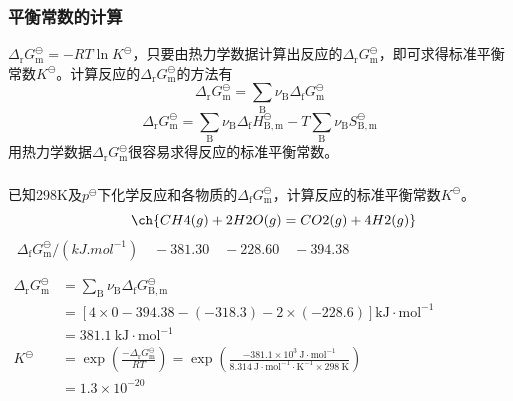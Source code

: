 \begin{frame}
    \frametitle{平衡常数的计算}
    \large $\Delta _\mathrm{r}G_\mathrm{m}^\ominus = -RT \ln K^\ominus$，只要由热力学数据计算出反应的$\Delta _\mathrm{r}G_\mathrm{m}^\ominus$，即可求得标准平衡常数$K^\ominus$。计算反应的$\Delta _\mathrm{r}G_\mathrm{m}^\ominus$的方法有
    \[
        \Delta_{\mathrm{r}} G_{\mathrm{m}}^{\ominus}=\sum_{\mathrm{B}} \nu_{\mathrm{B}} \Delta_{\mathrm{f}} G_{\mathrm{m}}^{\ominus}
    \]
    \[
        \Delta_{\mathrm{r}} G_{\mathrm{m}}^{\ominus}=\sum_{\mathrm{B}} \nu_{\mathrm{B}} \Delta_{\mathrm{f}} H_{\mathrm{B}, \mathrm{m}}^{\ominus}-T \sum_{\mathrm{B}} \nu_{\mathrm{B}} S_{\mathrm{B}, \mathrm{m}}^{\ominus}
    \]
    用热力学数据$\Delta _\mathrm{r}G_\mathrm{m}^\ominus$很容易求得反应的标准平衡常数。

\end{frame}


\begin{frame}[t]
    \frametitle{}

    \begin{example}
        已知298K及$p^\ominus$下化学反应和各物质的$\Delta _\mathrm{f}G_\mathrm{m}^\ominus$，计算反应的标准平衡常数$K^\ominus$。
        \[
            \qquad \ch{CH4(g) + 2 H2O(g) = CO2(g) + 4 H2(g)}
        \]
        \[
            \Delta _\mathrm{f}G_\mathrm{m}^\ominus/(\si{kJ.mol^{-1}}) \quad -381.30 \quad -228.60 \quad -394.38 \qquad \qquad \qquad \qquad \qquad \quad
        \]
    \end{example}
    \pause
    $\begin{aligned}
            \Delta_{\mathrm{r}} G_{\mathrm{m}}^{\ominus} & =\sum_{\mathrm{B}} \nu_{\mathrm{B}} \Delta_{\mathrm{f}} G_{\mathrm{B}, \mathrm{m}}^{\ominus}\\
            & =[4 \times 0-394.38-(-318.3)-2 \times(-228.6)] \mathrm{kJ} \cdot \mathrm{mol}^{-1}\\
            & =381.1 \mathrm{~kJ} \cdot \mathrm{mol}^{-1}\\
            K^{\ominus}& =\exp (\frac{-\Delta_{\mathrm{r}} G_{\mathrm{m}}^{\ominus}}{R T})=\exp (\frac{-381.1 \times 10^{3} \mathrm{~J} \cdot \mathrm{mol}^{-1}}{8.314 \mathrm{~J} \cdot \mathrm{mol}^{-1} \cdot \mathrm{K}^{-1} \times 298 \mathrm{~K}}) \\
            & =1.3 \times 10^{-20}
        \end{aligned}$

\end{frame}


